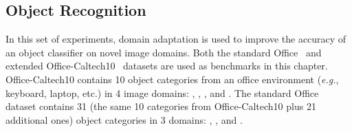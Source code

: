 \documentclass[graybox]{svmult}
\newcommand\eg{\emph{e.g.}}
\begin{document}
\subsection{Object Recognition}
\label{subsec:recog}
In this set of experiments, domain adaptation is used to improve the accuracy of an object classifier on novel image domains. Both the standard Office~\cite{saenko2010adapting} and extended Office-Caltech10~\cite{gfk} datasets are used as benchmarks in this chapter. Office-Caltech10 contains 10 object categories from an office environment (\eg, keyboard, laptop, etc.) in 4 image domains: , , , and . The standard Office dataset contains 31 (the same 10 categories from Office-Caltech10 plus 21 additional ones) object categories in 3 domains: , , and .

\begin{table}
\centering
{}
\caption{\small Object recognition accuracies of all 12 domain shifts on the Office-Caltech10 dataset~\cite{gfk} with SURF features, following the protocol of~\cite{gfk,sa,gopalan-iccv11,ref:kulis_cvpr11,saenko2010adapting}.}
\label{tab:result_office-caltech10_surf}
\vspace{-0.1in}
\end{table}
\end{document}
